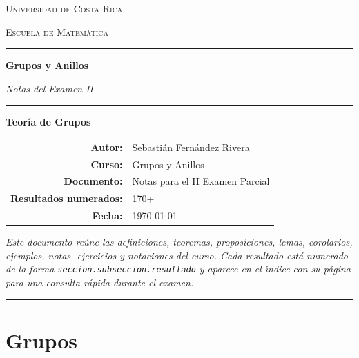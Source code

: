 \documentclass[11pt,twoside]{article}
\newcounter{result}[subsection]
\newcounter{thumbsec}
\newif\ifdrawthumb
\begin{document}
\begin{titlepage}
\thispagestyle{empty}
\centering
\vspace*{1.5cm}
{\scshape\Large Universidad de Costa Rica\par}
\vspace{0.3cm}
{\scshape\large Escuela de Matem\'atica\par}
\vspace{1.2cm}
{\color{blue!50!black}\rule{\textwidth}{1.2pt}}
\vspace{0.6cm}
{\Huge\bfseries Grupos y Anillos\par}
\vspace{0.5cm}
{\Large\itshape Notas del Examen II\par}
\vspace{0.4cm}
{\color{blue!50!black}\rule{\textwidth}{1.2pt}}
\vspace{1.4cm}
{\Large\bfseries Teor\'ia de Grupos\par}
\vspace{2.2cm}
\begin{tabular}{rl}
\textbf{Autor:}                & Sebasti\'{a}n Fern\'{a}ndez Rivera \\[4pt]
\textbf{Curso:}                & Grupos y Anillos \\[4pt]
\textbf{Documento:}            & Notas para el II Examen Parcial \\[4pt]
\textbf{Resultados numerados:} & 170$+$ \\[4pt]
\textbf{Fecha:}                & \today
\end{tabular}
\vfill
\begin{minipage}{0.85\textwidth}
\centering\itshape
Este documento re\'{u}ne las definiciones, teoremas, proposiciones, lemas, corolarios,
ejemplos, notas, ejercicios y notaciones del curso. Cada resultado est\'{a} numerado de
la forma \texttt{seccion.subseccion.resultado} y aparece en el \'{\i}ndice con su
p\'{a}gina para una consulta r\'{a}pida durante el examen.
\end{minipage}
\vspace{1cm}
{\color{blue!50!black}\rule{0.5\textwidth}{0.6pt}}
\end{titlepage}

\thispagestyle{empty}
{\hypersetup{linkcolor=black}\tableofcontents}
\newpage
\setcounter{thumbsec}{0}
\drawthumbtrue


\section{Grupos}
\end{document}
